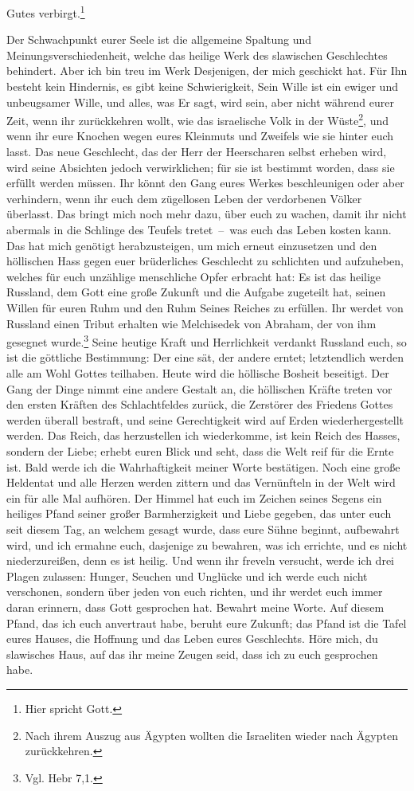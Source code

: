 Gutes verbirgt.\footnote{Hier spricht Gott.} 

Der Schwachpunkt eurer Seele ist die allgemeine Spaltung und Meinungsverschiedenheit, welche das heilige Werk des slawischen Geschlechtes behindert. Aber ich bin treu im Werk Desjenigen, der mich geschickt hat. Für Ihn besteht kein Hindernis, es gibt keine Schwierigkeit, Sein Wille ist ein ewiger und unbeugsamer Wille, und alles, was Er sagt, wird sein, aber nicht während eurer Zeit, wenn ihr zurückkehren wollt, wie das israelische Volk in der Wüste\footnote{Nach ihrem Auszug aus Ägypten wollten die Israeliten wieder nach Ägypten zurückkehren.}, und wenn ihr eure Knochen wegen eures Kleinmuts und Zweifels wie sie hinter euch lasst. Das neue Geschlecht, das der Herr der Heerscharen selbst erheben wird, wird seine Absichten jedoch verwirklichen; für sie ist bestimmt worden, dass sie erfüllt werden müssen. Ihr könnt den Gang eures Werkes beschleunigen oder aber verhindern, wenn ihr euch dem zügellosen Leben der verdorbenen Völker überlasst. Das bringt mich noch mehr dazu, über euch zu wachen, damit ihr nicht abermals in die Schlinge des Teufels tretet~--~was euch das Leben kosten kann. Das hat mich genötigt herabzusteigen, um mich erneut einzusetzen und den höllischen Hass gegen euer brüderliches Geschlecht zu schlichten und aufzuheben, welches für euch unzählige menschliche Opfer erbracht hat: Es ist das heilige Russland, dem Gott eine große Zukunft und die Aufgabe zugeteilt hat, seinen Willen für euren Ruhm und den Ruhm Seines Reiches zu erfüllen. Ihr werdet von Russland einen Tribut erhalten wie Melchisedek von Abraham, der von ihm gesegnet wurde.\footnote{Vgl. Hebr 7,1.} Seine heutige Kraft und Herrlichkeit verdankt Russland euch, so ist die göttliche Bestimmung: Der eine sät, der andere erntet; letztendlich werden alle am Wohl Gottes teilhaben. Heute wird die höllische Bosheit beseitigt. Der Gang der Dinge nimmt eine andere Gestalt an, die höllischen Kräfte treten vor den ersten Kräften des Schlachtfeldes zurück, die Zerstörer des Friedens Gottes werden überall bestraft, und seine Gerechtigkeit wird auf Erden wiederhergestellt werden. Das Reich, das herzustellen ich wiederkomme, ist kein Reich des Hasses, sondern der Liebe; erhebt euren Blick und seht, dass die Welt reif für die Ernte ist. Bald werde ich die Wahrhaftigkeit meiner Worte bestätigen. Noch eine große Heldentat und alle Herzen werden zittern und das Vernünfteln in der Welt wird ein für alle Mal aufhören. Der Himmel hat euch im Zeichen seines Segens ein heiliges Pfand seiner großer Barmherzigkeit und Liebe gegeben, das unter euch seit diesem Tag, an welchem gesagt wurde, dass eure Sühne beginnt, aufbewahrt wird, und ich ermahne euch, dasjenige zu bewahren, was ich errichte, und es nicht niederzureißen, denn es ist heilig. Und wenn ihr freveln versucht, werde ich drei Plagen zulassen: Hunger, Seuchen und Unglücke und ich werde euch nicht verschonen, sondern über jeden von euch richten, und ihr werdet euch immer daran erinnern, dass Gott gesprochen hat. Bewahrt meine Worte. Auf diesem Pfand, das ich euch anvertraut habe, beruht eure Zukunft; das Pfand ist die Tafel eures Hauses, die Hoffnung und das Leben eures Geschlechts. Höre mich, du slawisches Haus, auf das ihr meine Zeugen seid, dass ich zu euch gesprochen habe. 

